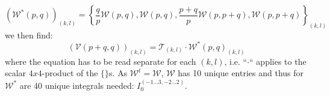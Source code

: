 \begin{equation}
\left(\mathcal{W}^*(p,q)\right)_{(k,l)} = \left\{\frac q p\mathcal W(p,q),\mathcal W(p,q),\frac {p+q} p\mathcal W(p,p+q),\mathcal{W}(p,p+q)\right\}_{(k,l)}
\end{equation}
we then find:
\begin{equation}
\left(\mathcal V(p+q,q)\right)_{(k,l)} = \mathcal T_{(k,l)}\cdot \mathcal W^*(p,q)_{(k,l)}
\end{equation}
where the equation has to be read separate for each $(k,l)$, i.e. ``$\cdot$`` applies to the scalar $4x4$-product of the $\{\}$s. As $\mathcal W^t = \mathcal W$, $\mathcal W$ has 10 unique entries and thus for $\mathcal W^*$ are 40 unique integrals needed: $I_0^{(-1\ldots 3,-2\ldots 2)}$.

